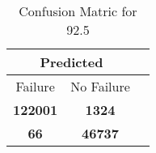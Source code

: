 \begin{table}[] 
\caption{Confusion Matric for 92.5} 
\label{Table: Prediction Accuracy-DMD92.5OnlySunEKF-resetReflectionEKF-top2perfectNoFailurePrediction-Reflection} 
\centering 
\begin{tabular} 
 {@{}ccc@{}} 
\toprule 
\multicolumn{2}{c}{\textbf{Predicted}}
 \\ \midrule 
\multicolumn{1}{|c|}{Failure} & 
\multicolumn{1}{c|}{No Failure}
 \\ \midrule 
\multicolumn{1}{|c|}{\color{green}\textbf{122001}} & 
\multicolumn{1}{c|}{\color{red}\textbf{1324}}
 \\ \midrule 
\multicolumn{1}{|c|}{\color{red}\textbf{66}} & 
\multicolumn{1}{c|}{\color{green}\textbf{46737}}
 \\ \bottomrule 
\end{tabular} 
\end{table} 
